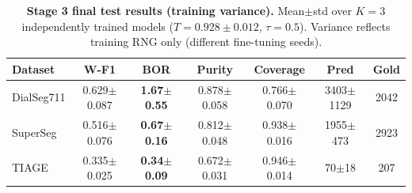 \begin{table}[t]
\centering
\small
\begin{tabular}{lcccccc}
\toprule
Dataset & W-F1 & BOR & Purity & Coverage & Pred & Gold \\
\midrule
DialSeg711 & 0.629$\pm$0.087 & \textbf{1.67$\pm$0.55} & 0.878$\pm$0.058 & 0.766$\pm$0.070 & 3403$\pm$1129 & 2042 \\
SuperSeg & 0.516$\pm$0.076 & \textbf{0.67$\pm$0.16} & 0.812$\pm$0.048 & 0.938$\pm$0.016 & 1955$\pm$473 & 2923 \\
TIAGE & 0.335$\pm$0.025 & \textbf{0.34$\pm$0.09} & 0.672$\pm$0.031 & 0.946$\pm$0.014 & 70$\pm$18 & 207 \\
\bottomrule
\end{tabular}
\caption{\textbf{Stage 3 final test results (training variance).}
Mean$\pm$std over $K=3$ independently trained models ($T=0.928\pm0.012$, $\tau=0.5$).
Variance reflects training RNG only (different fine-tuning seeds).}
\label{tab:stage3-trainvar}
\end{table}
